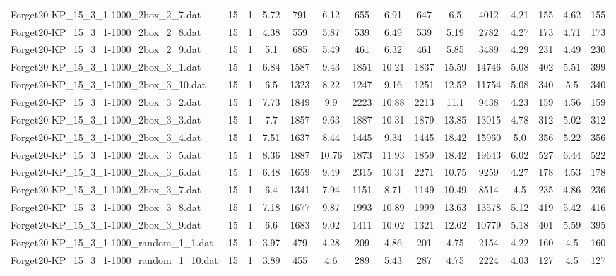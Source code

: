 \begin{table}[!ht]
{\begin{tabular}{lcccccccccccccc}
Forget20-KP\_15\_3\_1-1000\_2box\_2\_7.dat & 15 & 1 & 5.72 & 791 & 6.12 & 655 & 6.91 & 647 & 6.5 & 4012 & 4.21 & 155 & 4.62 & 155 \\
Forget20-KP\_15\_3\_1-1000\_2box\_2\_8.dat & 15 & 1 & 4.38 & 559 & 5.87 & 539 & 6.49 & 539 & 5.19 & 2782 & 4.27 & 173 & 4.71 & 173 \\
Forget20-KP\_15\_3\_1-1000\_2box\_2\_9.dat & 15 & 1 & 5.1 & 685 & 5.49 & 461 & 6.32 & 461 & 5.85 & 3489 & 4.29 & 231 & 4.49 & 230 \\
Forget20-KP\_15\_3\_1-1000\_2box\_3\_1.dat & 15 & 1 & 6.84 & 1587 & 9.43 & 1851 & 10.21 & 1837 & 15.59 & 14746 & 5.08 & 402 & 5.51 & 399 \\
Forget20-KP\_15\_3\_1-1000\_2box\_3\_10.dat & 15 & 1 & 6.5 & 1323 & 8.22 & 1247 & 9.16 & 1251 & 12.52 & 11754 & 5.08 & 340 & 5.5 & 340 \\
Forget20-KP\_15\_3\_1-1000\_2box\_3\_2.dat & 15 & 1 & 7.73 & 1849 & 9.9 & 2223 & 10.88 & 2213 & 11.1 & 9438 & 4.23 & 159 & 4.56 & 159 \\
Forget20-KP\_15\_3\_1-1000\_2box\_3\_3.dat & 15 & 1 & 7.7 & 1857 & 9.63 & 1887 & 10.31 & 1879 & 13.85 & 13015 & 4.78 & 312 & 5.02 & 312 \\
Forget20-KP\_15\_3\_1-1000\_2box\_3\_4.dat & 15 & 1 & 7.51 & 1637 & 8.44 & 1445 & 9.34 & 1445 & 18.42 & 15960 & 5.0 & 356 & 5.22 & 356 \\
Forget20-KP\_15\_3\_1-1000\_2box\_3\_5.dat & 15 & 1 & 8.36 & 1887 & 10.76 & 1873 & 11.93 & 1859 & 18.42 & 19643 & 6.02 & 527 & 6.44 & 522 \\
Forget20-KP\_15\_3\_1-1000\_2box\_3\_6.dat & 15 & 1 & 6.48 & 1659 & 9.49 & 2315 & 10.31 & 2271 & 10.75 & 9259 & 4.27 & 178 & 4.53 & 178 \\
Forget20-KP\_15\_3\_1-1000\_2box\_3\_7.dat & 15 & 1 & 6.4 & 1341 & 7.94 & 1151 & 8.71 & 1149 & 10.49 & 8514 & 4.5 & 235 & 4.86 & 236 \\
Forget20-KP\_15\_3\_1-1000\_2box\_3\_8.dat & 15 & 1 & 7.18 & 1677 & 9.87 & 1993 & 10.89 & 1999 & 13.63 & 13578 & 5.12 & 419 & 5.42 & 416 \\
Forget20-KP\_15\_3\_1-1000\_2box\_3\_9.dat & 15 & 1 & 6.6 & 1683 & 9.02 & 1411 & 10.02 & 1321 & 12.62 & 10779 & 5.18 & 401 & 5.59 & 395 \\
Forget20-KP\_15\_3\_1-1000\_random\_1\_1.dat & 15 & 1 & 3.97 & 479 & 4.28 & 209 & 4.86 & 201 & 4.75 & 2154 & 4.22 & 160 & 4.5 & 160 \\
Forget20-KP\_15\_3\_1-1000\_random\_1\_10.dat & 15 & 1 & 3.89 & 455 & 4.6 & 289 & 5.43 & 287 & 4.75 & 2224 & 4.03 & 127 & 4.5 & 127 \\

\end{tabular}}
\end{table}
